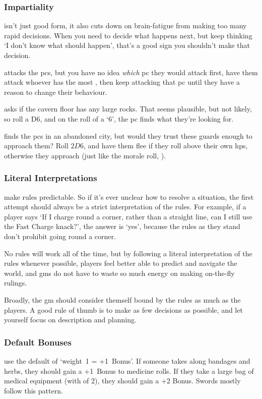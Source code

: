 \begin{multicols}{2}
\subsubsection{Impartiality}
isn't just good form, it also cuts down on brain-fatigue from making too many rapid decisions.
When you need to decide what happens next, but keep thinking `I don't know what should happen', that's a good sign you shouldn't make that decision.

 attacks the \glspl{pc}, but you have no idea \textit{which} \gls{pc} they would attack first, have them attack whoever has the most , then keep attacking that \gls{pc} until they have a reason to change their behaviour.

 asks if the cavern floor has any large rocks.
That seems plausible, but not likely, so roll a D6, and on the roll of a `6', the \gls{pc} finds what they're looking for.

 finds the \glspl{pc} in an abandoned city, but would they trust these \glspl{guard} enough to approach them?
Roll $2D6$, and have them flee if they roll above their own \glspl{hp}, otherwise they approach (just like the morale roll, ).

\subsubsection{Literal Interpretations}
make rules predictable.
So if it's ever unclear how to resolve a situation, the first attempt should always be a strict interpretation of the rules.
For example, if a player says `If I charge round a corner, rather than a straight line, can I still use the Fast Charge knack?', the answer is `yes', because the rules as they stand don't prohibit going round a corner.

No rules will work all of the time, but by following a literal interpretation of the rules whenever possible, players feel better able to predict and navigate the world, and \glspl{gm} do not have to waste so much energy on making on-the-fly rulings.

Broadly, the \gls{gm} should consider themself bound by the rules as much as the players.
A good rule of thumb is to make as few decisions as possible, and let yourself focus on description and planning.

\subsubsection{Default Bonuses}
use the default of `\gls{weight}~1 = +1~Bonus'.
If someone takes along bandages and herbs, they should gain a +1~Bonus to medicine rolls.
If they take a large bag of medical equipment (with  of 2), they should gain a +2 Bonus.
Swords mostly follow this pattern.


\end{multicols}
